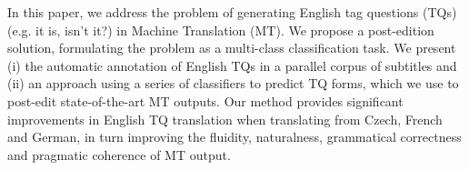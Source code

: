 In this paper, we address the problem of generating English tag questions (TQs) (e.g. it is, isn't it?) in Machine Translation (MT). We propose a post-edition solution, formulating the problem as a multi-class classification task. We present (i) the automatic annotation of English TQs in a parallel corpus of subtitles and (ii) an approach using a series of classifiers to predict TQ forms, which we use to post-edit state-of-the-art MT outputs. Our method provides significant improvements in English TQ translation when translating from Czech, French and German, in turn improving the fluidity, naturalness, grammatical correctness and pragmatic coherence of MT output.
